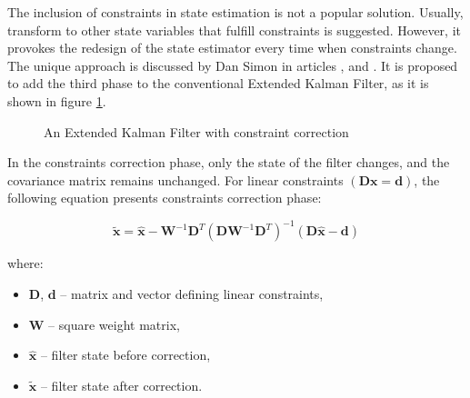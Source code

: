 The inclusion of constraints in state estimation is not a popular solution. Usually, transform to other state variables that fulfill constraints is suggested. However, it provokes the redesign of the state estimator every time when constraints change. The unique approach is discussed by Dan Simon in articles \cite{simon}, \cite{simon2010kalman} and \cite{simon2006kalman}. It is proposed to add the third phase to the conventional Extended Kalman Filter, as it is shown in figure \ref{ekf_three_phases}.

\begin{figure}[!h]
	\begin{center}
	\end{center}
	\caption{An Extended Kalman Filter with constraint correction}
	\label{ekf_three_phases}
\end{figure}

In the constraints correction phase, only the state of the filter changes, and the covariance matrix remains unchanged. For linear constraints $\left( \bm{D} \bm{x} = \bm{d}  \right)$, the following equation presents constraints correction phase:

\begin{equation}
	\bm{\tilde{x}} = \bm{\hat{x}} - \bm{W}^{-1} \bm{D}^T \left( \bm{D} \bm{W}^{-1} \bm{D}^T \right)^{-1} \left( \bm{D} \bm{\hat{x}} - \bm{d}  \right)
	\label{constraint_corr}
\end{equation}

where:
\begin{itemize}[noitemsep]
	\item $\bm{D}$, $\bm{d}$ -- matrix and vector defining linear constraints,
	\item $\bm{W}$ -- square weight matrix,
	\item $\bm{\hat{x}}$ -- filter state before correction,
	\item $\bm{\tilde{x}}$ -- filter state after correction.
\end{itemize}

